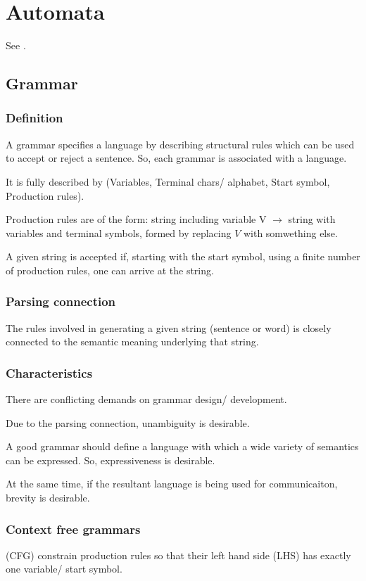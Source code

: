 \documentclass[oneside, article]{memoir}
\begin{document}
\section{Automata}
See \cite{linz}.

\subsection{Grammar}
\subsubsection{Definition}
A grammar specifies a language by describing structural rules which can be used to accept or reject a sentence. So, each grammar is associated with a language.

It is fully described by (Variables, Terminal chars/ alphabet, Start symbol, Production rules).

Production rules are of the form:
string including variable V $\to$ string with variables and terminal symbols, formed by replacing $V$ with somwething else.

A given string is accepted if, starting with the start symbol, using a finite number of production rules, one can arrive at the string.

\subsubsection{Parsing connection}
The rules involved in generating a given string (sentence or word) is closely connected to the semantic meaning underlying that string. 

\subsubsection{Characteristics}
There are conflicting demands on grammar design/ development.

Due to the parsing connection, unambiguity is desirable.

A good grammar should define a language with which a wide variety of semantics can be expressed. So, expressiveness is desirable.

At the same time, if the resultant language is being used for communicaiton, brevity is desirable. 

\subsubsection{Context free grammars}
(CFG) constrain production rules so that their left hand side (LHS) has exactly one variable/ start symbol.
\end{document}
